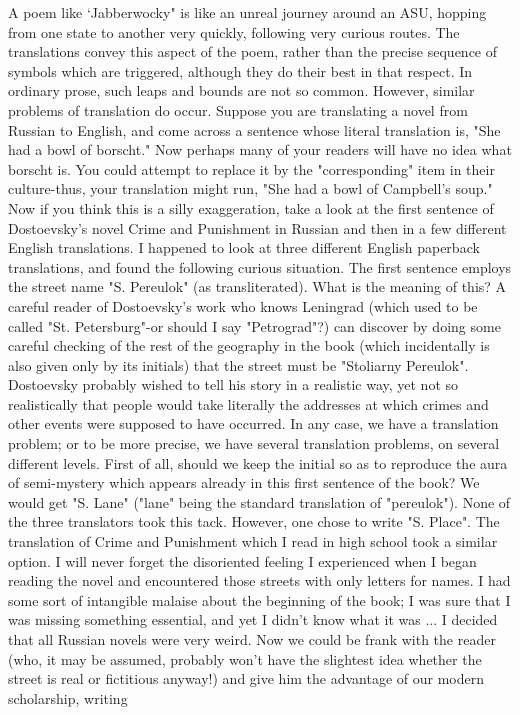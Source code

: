 A poem like `Jabberwocky" is like an unreal journey around an ASU, hopping from one
state to another very quickly, following very curious routes. The translations convey this
aspect of the poem, rather than the precise sequence of symbols which are triggered,
although they do their best in that respect. In ordinary prose, such leaps and bounds are
not so common. However, similar problems of translation do occur. Suppose you are
translating a novel from Russian to English, and come across a sentence whose literal
translation is, "She had a bowl of borscht." Now perhaps many of your readers will have
no idea what borscht is. You could attempt to replace it by the "corresponding" item in
their culture-thus, your translation might run, "She had a bowl of Campbell's soup." Now
if you think this is a silly exaggeration, take a look at the first sentence of Dostoevsky's
novel Crime and Punishment in Russian and then in a few different English translations. I
happened to look at three different English paperback translations, and found the
following curious situation.
         The first sentence employs the street name "S. Pereulok" (as transliterated). What
is the meaning of this? A careful reader of Dostoevsky's work who knows Leningrad
(which used to be called "St. Petersburg"-or should I say "Petrograd"?) can discover by
doing some careful checking of the rest of the geography in the book (which incidentally
is also given only by its initials) that the street must be "Stoliarny Pereulok". Dostoevsky
probably wished to tell his story in a realistic way, yet not so realistically that people
would take literally the addresses at which crimes and other events were supposed to
have occurred. In any case, we have a translation problem; or to be more precise, we have
several translation problems, on several different levels.
         First of all, should we keep the initial so as to reproduce the aura of semi-mystery
which appears already in this first sentence of the book? We would get "S. Lane" ("lane"
being the standard translation of "pereulok"). None of the three translators took this tack.
However, one chose to write "S. Place". The translation of Crime and Punishment which
I read in high school took a similar option. I will never forget the disoriented feeling I
experienced when I began reading the novel and encountered those streets with only
letters for names. I had some sort of intangible malaise about the beginning of the book; I
was sure that I was missing something essential, and yet I didn't know what it was ... I
decided that all Russian novels were very weird.
         Now we could be frank with the reader (who, it may be assumed, probably won't
have the slightest idea whether the street is real or fictitious anyway!) and give him the
advantage of our modern scholarship, writing





